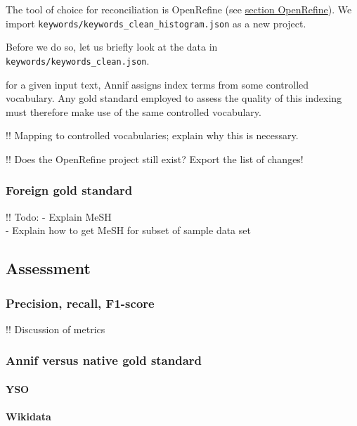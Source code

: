 The tool of choice for reconciliation is OpenRefine (see
\protect\hyperlink{openrefine}{section OpenRefine}). We import
\texttt{keywords/keywords\_clean\_histogram.json} as a new project.

Before we do so, let us briefly look at the data in
\texttt{keywords/keywords\_clean.json}.

for a given input text, Annif assigns index terms from some controlled
vocabulary. Any gold standard employed to assess the quality of this
indexing must therefore make use of the same controlled vocabulary.

!! Mapping to controlled vocabularies; explain why this is necessary.

!! Does the OpenRefine project still exist? Export the list of changes!

\hypertarget{foreign-gold-standard}{%
\subsubsection{Foreign gold standard}\label{foreign-gold-standard}}

!! Todo: - Explain MeSH\\
- Explain how to get MeSH for subset of sample data set

\hypertarget{assessment}{%
\subsection{Assessment}\label{assessment}}

\hypertarget{precision-recall-f1-score}{%
\subsubsection{Precision, recall,
F1-score}\label{precision-recall-f1-score}}

!! Discussion of metrics

\hypertarget{annif-versus-native-gold-standard}{%
\subsubsection{Annif versus native gold
standard}\label{annif-versus-native-gold-standard}}

\hypertarget{yso}{%
\paragraph{YSO}\label{yso}}

\hypertarget{wikidata}{%
\paragraph{Wikidata}\label{wikidata}}

